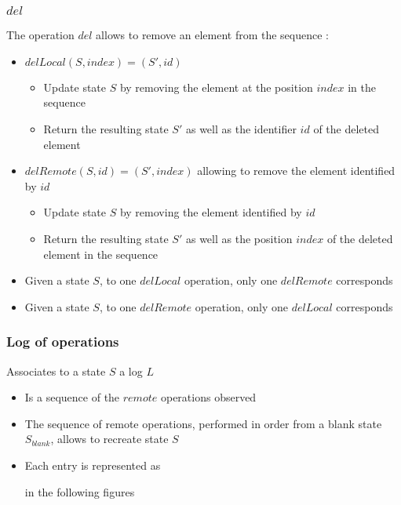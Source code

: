 \documentclass[a4paper]{article}
\begin{document}
\subsubsection{$del$}

The operation $del$ allows to remove an element from the sequence :
\begin{itemize}
  \item $delLocal(S, index) = (S', id)$
  \begin{itemize}
    \item Update state $S$ by removing the element at the position $index$ in the sequence
    \item Return the resulting state $S'$ as well as the identifier $id$ of the deleted element
  \end{itemize}
  \item $delRemote(S, id) = (S', index)$ allowing to remove the element identified by $id$
  \begin{itemize}
    \item Update state $S$ by removing the element identified by $id$
    \item Return the resulting state $S'$ as well as the position $index$ of the deleted element in the sequence
  \end{itemize}
  \item Given a state $S$, to one $delLocal$ operation, only one $delRemote$ corresponds
  \item Given a state $S$, to one $delRemote$ operation, only one $delLocal$ corresponds
\end{itemize}

\subsubsection{Log of operations}

Associates to a state $S$ a log $L$
\begin{itemize}
  \item Is a sequence of the $remote$ operations observed
  \item The sequence of remote operations,
    performed in order from a blank state $S_{blank}$,
    allows to recreate state $S$
  \item Each entry is represented as
     in the following figures
\end{itemize}
\end{document}
